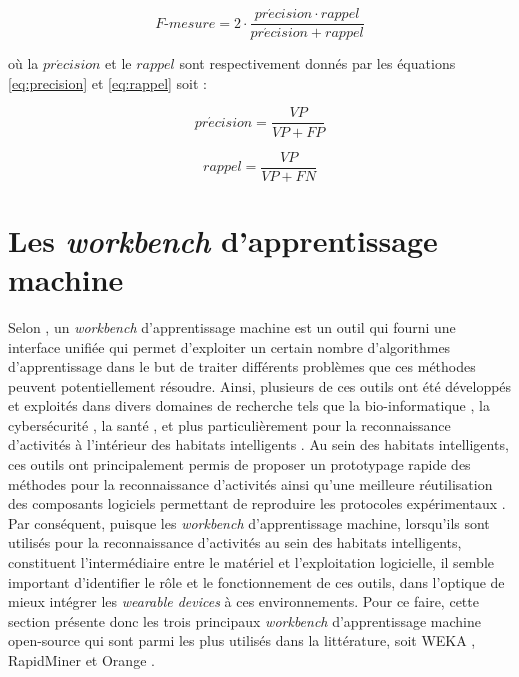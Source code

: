 \begin{equation}
	\label{eq:f-score}
	F\mbox{-} mesure = 2 \cdot \frac{pr\acute{e}cision \cdot rappel}{pr\acute{e}cision + rappel}
\end{equation}

\noindent où la $pr\acute{e}cision$ et le $rappel$ sont respectivement donnés par les équations \ref{eq:precision} et \ref{eq:rappel} soit :

\begin{equation}
	\label{eq:precision}
	pr\acute{e}cision = \frac{VP}{VP+FP}
\end{equation}

\begin{equation}
	\label{eq:rappel}
	rappel = \frac{VP}{VP+FN}
\end{equation}

\section{Les \textit{workbench} d'apprentissage machine}

Selon \cite{Langlois2008}, un \textit{workbench} d'apprentissage machine est un outil qui fourni une interface unifiée qui permet d'exploiter un certain nombre d'algorithmes d'apprentissage dans le but de traiter différents problèmes que ces méthodes peuvent potentiellement résoudre. Ainsi, plusieurs de ces outils ont été développés et exploités dans divers domaines de recherche tels que la bio-informatique \citep{Larranaga2006}, la cybersécurité \citep{Handa2019}, la santé \citep{Rajkomar2019}, et plus particulièrement pour la reconnaissance d'activités à l'intérieur des habitats intelligents \citep{Chapron2018,Ramirez-Prado2019}. Au sein des habitats intelligents, ces outils ont principalement permis de proposer un prototypage rapide des méthodes pour la reconnaissance d'activités ainsi qu'une meilleure réutilisation des composants logiciels permettant de reproduire les protocoles expérimentaux \citep{Langlois2008}. Par conséquent, puisque les \textit{workbench} d'apprentissage machine, lorsqu'ils sont utilisés pour la reconnaissance d'activités au sein des habitats intelligents, constituent l'intermédiaire entre le matériel et l'exploitation logicielle, il semble important d'identifier le rôle et le fonctionnement de ces outils, dans l'optique de mieux intégrer les \textit{wearable devices} à ces environnements. Pour ce faire, cette section présente donc les trois principaux \textit{workbench} d'apprentissage machine open-source qui sont parmi les plus utilisés dans la littérature, soit WEKA \citep{Holmes1994}, RapidMiner \citep{Ritthoo2003,Hofmann2014} et Orange \citep{Demsar2004,Demsar2013}.

